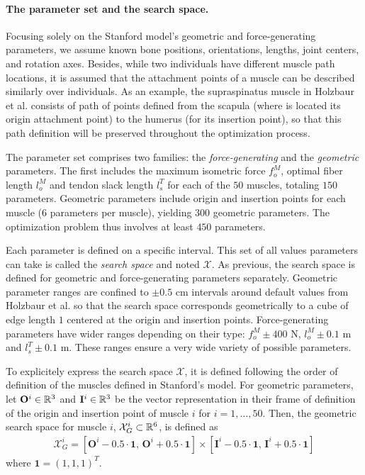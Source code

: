 \paragraph*{The parameter set and the search space.}
Focusing solely on the Stanford model's geometric and force-generating parameters, we assume known bone positions, orientations, lengths, joint centers, and rotation axes. Besides, while two individuals have different muscle path locations, it is assumed that the attachment points of a muscle can be described similarly over individuals. As an example, the supraspinatus muscle in Holzbaur et al. consists of path of points defined from the scapula (where is located its origin attachment point) to the humerus (for its insertion point), so that this path definition will be preserved throughout the optimization process.

The parameter set comprises two families: the \emph{force-generating} and the \emph{geometric} parameters. The first includes the maximum isometric force $f_o^M$, optimal fiber length $l_o^M$ and tendon slack length $l_s^T$ for each of the $50$ muscles, totaling $150$ parameters. Geometric parameters include origin and insertion points for each muscle ($6$ parameters per muscle), yielding $300$ geometric parameters. The optimization problem thus involves at least $450$ parameters.

Each parameter is defined on a specific interval. This set of all values parameters can take is called the \emph{search space} and noted $\mathcal{X}$. As previous, the search space is defined for geometric and force-generating parameters separately.
Geometric parameter ranges are confined to $\pm 0.5$ cm intervals around default values from Holzbaur et al. so that the search space corresponds geometrically to a cube of edge length $1$ centered at the origin and insertion points. Force-generating parameters have wider ranges depending on their type:  $f_o^M \pm 400$ N, $l_o^M \pm 0.1$ m and $l_s^T \pm 0.1$ m. These ranges ensure a very wide variety of possible parameters.

To explicitely express the search space $\mathcal{X}$, it is defined  following the order of definition of the muscles defined in Stanford's model. For geometric parameters, let $\mathbf{O}^i\in\mathbb{R}^3$ and $\mathbf{I}^i\in\mathbb{R}^3$ be the vector representation in their frame of definition of the origin and insertion point of muscle $i$ for $i = 1, \dots, 50$. Then, the geometric search space for muscle $i$, $\mathcal{X}_G^i \subset \mathbb{R}^6$, is defined as
\begin{align*}
    \mathcal{X}_G^i = [\mathbf{O}^i - 0.5\cdot \mathbf{1},\, \mathbf{O}^i + 0.5\cdot \mathbf{1}] \times [\mathbf{I}^i - 0.5\cdot\mathbf{1},\, \mathbf{I}^i + 0.5\cdot\mathbf{1}]
\end{align*}
where $\mathbf{1} = (1,1,1)^T$.

